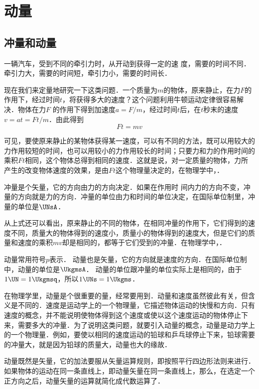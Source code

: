 \chapter{动量}\label{chapter-momentum}


\section{冲量和动量}
一辆汽车，受到不同的牵引力时，从开动到获得一定的速
度，需要的时间不同．牵引力大，需要的时间短，牵引力小，需要的时间长．

现在我们来定量地研究一下这类问题．一个质量为$m$的物体，原来静止，在力$F$的作用下，经过时间$t$，将获得多大的速度？这个问题利用牛顿运动定律很容易解决．物体在力$F$
的作用下得到加速度$a=F/m$，经过时间$t$后，在$t$秒末的速度
$v=at=Ft/m$．由此得到
\[Ft=mv\]

可见，要使原来静止的某物体获得某一速度，可以有不同的方法，既可以用较大的力作用较短的时间，也可以用较小的力作用较长的时间；只要力和力的作用时间的乘积$Ft$相同，这个物体总得到相同的速度．这就是说，对一定质量的物体，力所产生的改变物体速度的效果，是由$Ft$这个物理量决定的，在物理学中，．

冲量是个矢量，它的方向由力的方向决定．如果在作用时
间内力的方向不变，冲量的方向就是力的方向．冲量的单位由力和时间的单位决定，在国际单位制里，冲量的单位是$\UNsA$．

从上式还可以看出，原来静止的不同的物体，在相同冲量的作用下，它们得到的速度不同，质量大的物体得到的速度小，质量小的物体得到的速度大，但是它们的质量和速度的乘积$mv$却是相同的，都等于它们受到的冲量．在物理学中，．

动量常用符号$p$表示．
动量也是矢量，它的方向就是速度的方向．在国际单位制中，动量的单位是$\UkgmsA$．
动量的单位跟冲量的单位实际上是相同的，由于$1 \UN=1 \Ukgmsq$，所以$1\UNs=1 \Ukgms$．

在物理学里，动量是个很重要的量，经常要用到．动量和速度虽然彼此有关，但含义是不同的．速度是运动学上的一个物理量，它描述物体运动的快慢和方向．只有速度的概念，并不能说明使物体得到这个速度或使以这个速度运动的物体停止下来，需要多大的冲量．为了说明这类问题，就要引入动量的概念，动量是动力学上的一个物理量．例如，要使以相同的速度运动的铅球和乒乓球停止下来，铅球需要的冲量大，就是因为铅球的质量大，动量也大的缘故．

动量既然是矢量，它的加法要服从矢量运算规则，即按照平行四边形法则来进行．
如果物体的运动在同一条直线上，即动量矢量在同一条直线上，那么，在选定一个正方向之后，动量矢量的运算就简化成代数运算了．


